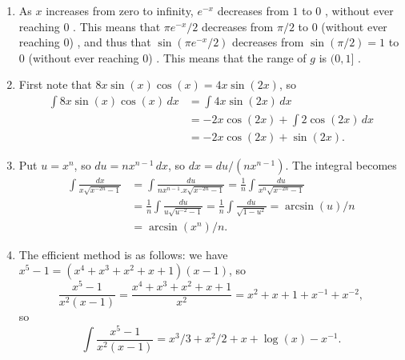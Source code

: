 \documentclass{amsart}
\renewcommand{\:}       {\colon}
\newcommand{\mks}[1]    {}
\newcommand{\mk}        {}
\begin{document}
\renewcommand{\theenumi}{B\arabic{enumi}}

\begin{enumerate}

\item %
  As $x$ increases from zero to infinity, $e^{-x}$ decreases from $1$
  to $0$ \mk, without ever reaching $0$ \mk.  This means that
  $\pi e^{-x}/2$ decreases from $\pi/2$ to $0$ (without ever reaching
  $0$) \mks{2}, and thus that $\sin(\pi e^{-x}/2)$ decreases from
  $\sin(\pi/2)=1$ to $0$ (without ever reaching $0$) \mk.  This means
  that the range of $g$ is $(0,1]$ \mks{2}.

 \item %
  First note that $8x\sin(x)\cos(x)=4x\sin(2x)$, so 
  \begin{align*}
   \int 8x\sin(x)\cos(x)\,dx &= 
    \int 4x\sin(2x)\,dx \\
    &= -2x\cos(2x) + \int 2\cos(2x)\, dx \\
    &= -2x\cos(2x) + \sin(2x).
  \end{align*}

 \item %
  Put $u=x^n$, so $du=nx^{n-1}\,dx$, so $dx=du/(nx^{n-1})$.  The
  integral becomes
  \begin{align*}
   \int \frac{dx}{x\sqrt{x^{-2n}-1}} &= 
   \int \frac{du}{nx^{n-1}.x\sqrt{x^{-2n}-1}} = 
   \frac{1}{n}\int \frac{du}{x^n\sqrt{x^{-2n}-1}} \\
   &= \frac{1}{n}\int\frac{du}{u\sqrt{u^{-2}-1}} = 
   \frac{1}{n}\int\frac{du}{\sqrt{1-u^2}} = \arcsin(u)/n \\
   &= \arcsin(x^n)/n.
  \end{align*}

 \item %
  The efficient method is as follows: we have
  $x^5-1=(x^4+x^3+x^2+x+1)(x-1)$, so  
  \[ \frac{x^5-1}{x^2(x-1)} = 
     \frac{x^4+x^3+x^2+x+1}{x^2} = 
     x^2 + x + 1 + x^{-1} + x^{-2}, 
  \]
  so 
  \[ \int \frac{x^5-1}{x^2(x-1)} =
      x^3/3 + x^2/2 + x + \log(x) - x^{-1} \mks{2}.
  \]


\end{enumerate}
\end{document}
